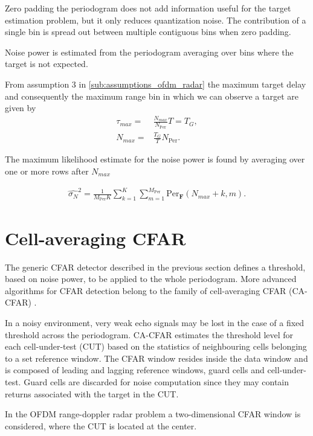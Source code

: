 Zero padding the periodogram does not add information useful for the target estimation problem, but it only reduces quantization noise. The contribution of a single bin is spread out between multiple contiguous bins when zero padding.

Noise power is estimated from the periodogram averaging over bins where the target is not expected.

From assumption 3 in \ref{sub:assumptions_ofdm_radar} the maximum target delay and consequently the maximum range bin in which we can observe a target are given by
\begin{align}
	\tau_{max} =& \frac{N_{max}}{N_{\text{Per}}}T = T_G ,\\
	N_{max} =& \frac{T_G}{T}N_{\text{Per}}.
\end{align} 

The maximum likelihood estimate for the noise power is found by averaging over one or more rows after $N_{max}$

\begin{align}
\label{align: threshold_noise_power}
	\hat{\sigma_N}^2 = \frac{1}{M_{\text{Per}}K} \sum_{k=1}^K \sum_{m=1}^{M_{\text{Per}}} \text{Per}_{\bm{F}}(N_{max}+k, m).
\end{align}

\section{Cell-averaging CFAR}
\label{sec:cell averaging CFAR}

The generic CFAR detector described in the previous section defines a threshold, based on noise power, to be applied to the whole periodogram. More advanced algorithms for CFAR detection belong to the family of cell-averaging CFAR (CA-CFAR) \cite{Richards_2014}.

In a noisy environment, very weak echo signals may be lost in the case of a fixed threshold across the periodogram. CA-CFAR estimates the threshold level for each cell-under-test (CUT) based on the statistics of neighbouring cells belonging to a set reference window.
The CFAR window resides inside the data window and is composed of leading and lagging reference windows, guard cells and cell-under-test. Guard cells are discarded for noise computation since they may contain returns associated with the target in the CUT.

In the OFDM range-doppler radar problem a two-dimensional CFAR window is considered, where the CUT is located at the center.

